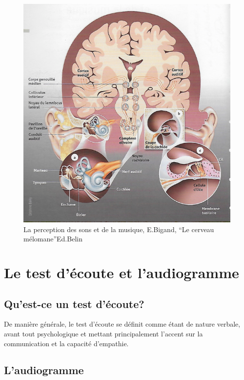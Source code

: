         \begin{figure}
	\centering
	\includegraphics[width=1\linewidth]{images/schemacerveauoreillebigand.png}
	\caption[Schéma du déroulement]{La perception des sons et de
          la musique, E.Bigand, ``Le cerveau mélomane''Ed.Belin}
       
	\label{cerveauoreillebigand1}
\end{figure}




\section{Le test d'écoute et l'audiogramme}

\subsection{Qu'est-ce un test d'écoute?}

De manière générale, le test d'écoute se  définit comme étant de nature verbale, avant tout 
psychologique et mettant principalement l'accent sur la communication
et la capacité d'empathie.





\subsection{L'audiogramme}

